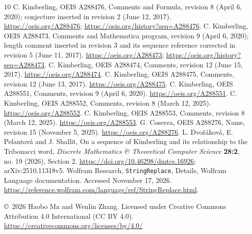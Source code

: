 \documentclass[11pt]{article}
\begin{document}
\begingroup\small
\begin{thebibliography}{10}
\setlength{\itemsep}{2pt}
 C. Kimberling, OEIS A288476, Comments and Formula,
revision 8 (April 6, 2020); conjecture inserted in revision 2 (June 12, 2017).
\url{https://oeis.org/A288476};
\url{https://oeis.org/history?seq=A288476}.
 C. Kimberling, OEIS A288473, Comments and Mathematica program,
revision 9 (April 6, 2020); length comment inserted in revision 3 and
its sequence reference corrected in revision 5 (June 11, 2017).
\url{https://oeis.org/A288473}; \url{https://oeis.org/history?seq=A288473}.
 C. Kimberling, OEIS A288474, Comments,
revision 12 (June 15, 2017). \url{https://oeis.org/A288474}.
 C. Kimberling, OEIS A288475, Comments,
revision 12 (June 13, 2017). \url{https://oeis.org/A288475}.
 C. Kimberling, OEIS A288551, Comments,
revision 9 (April 6, 2020). \url{https://oeis.org/A288551}.
 C. Kimberling, OEIS A288552, Comments,
revision 8 (March 12, 2025). \url{https://oeis.org/A288552}.
 C. Kimberling, OEIS A288553, Comments,
revision 8 (March 12, 2025). \url{https://oeis.org/A288553}.
 G. Coserea, OEIS A288276, Name,
revision 15 (November 5, 2025). \url{https://oeis.org/A288276}.
 L. Dvo\v{r}\'akov\'a, E. Pelantov\'a and J. Shallit,
On a sequence of Kimberling and its relationship to the Tribonacci word,
\emph{Discrete Mathematics \& Theoretical Computer Science}
\textbf{28:2}, no. 19 (2026), Section 2.
\url{https://doi.org/10.46298/dmtcs.16926}; arXiv:2510.11318v5.
 Wolfram Research, \texttt{StringReplace}, Details,
Wolfram Language documentation. Accessed November 17, 2026.
\url{https://reference.wolfram.com/language/ref/StringReplace.html}.
\end{thebibliography}
\endgroup
\bigskip\noindent\small
\copyright\ 2026 Haobo Ma and Wenlin Zhang.
Licensed under Creative Commons Attribution 4.0 International (CC BY 4.0).
\url{https://creativecommons.org/licenses/by/4.0/}
\end{document}
